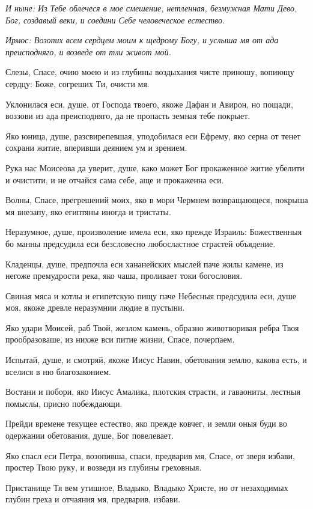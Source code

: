 \itshape И ныне\normalfont{}: Из Тебе облечеся в мое смешение, нетленная, безмужная Мати Дево, Бог, создавый веки, и соедини Себе человеческое естество. 




\itshape Ирмос\normalfont{}: Возопих всем сердцем моим к щедрому Богу, и услыша мя от ада преисподняго, и возведе от тли живот мой.


Слезы, Спасе, очию моею и из глубины воздыхания чисте приношу, вопиющу сердцу: Боже, согреших Ти, очисти мя.


Уклонилася еси, душе, от Господа твоего, якоже Дафан и Авирон, но пощади, воззови из ада преисподняго, да не пропасть земная тебе покрыет.


Яко юница, душе, разсвирепевшая, уподобилася еси Ефрему, яко серна от тенет сохрани житие, вперивши деянием ум и зрением.


Рука нас Моисеова да уверит, душе, како может Бог прокаженное житие убелити и очистити, и не отчайся сама себе, аще и прокаженна еси.


Волны, Спасе, прегрешений моих, яко в мори Чермнем возвращающеся, покрыша мя внезапу, яко египтяны иногда и тристаты.


Неразумное, душе, произволение имела еси, яко прежде Израиль: Божественныя бо манны предсудила еси безсловесно любосластное страстей объядение.


Кладенцы, душе, предпочла еси хананейских мыслей паче жилы камене, из негоже премудрости река, яко чаша, проливает токи богословия.


Свиная мяса и котлы и египетскую пищу паче Небесныя предсудила еси, душе моя, якоже древле неразумнии людие в пустыни.


Яко удари Моисей, раб Твой, жезлом камень, образно животворивая ребра Твоя прообразоваше, из нихже вси питие жизни, Спасе, почерпаем.


Испытай, душе, и смотряй, якоже Иисус Навин, обетования землю, какова есть, и вселися в ню благозаконием.


Востани и побори, яко Иисус Амалика, плотския страсти, и гаваониты, лестныя помыслы, присно побеждающи.


Прейди времене текущее естество, яко прежде ковчег, и земли оныя буди во одержании обетования, душе, Бог повелевает.


Яко спасл еси Петра, возопивша, спаси, предварив мя, Спасе, от зверя избави, простер Твою руку, и возведи из глубины греховныя.


Пристанище Тя вем утишное, Владыко, Владыко Христе, но от незаходимых глубин греха и отчаяния мя, предварив, избави.


